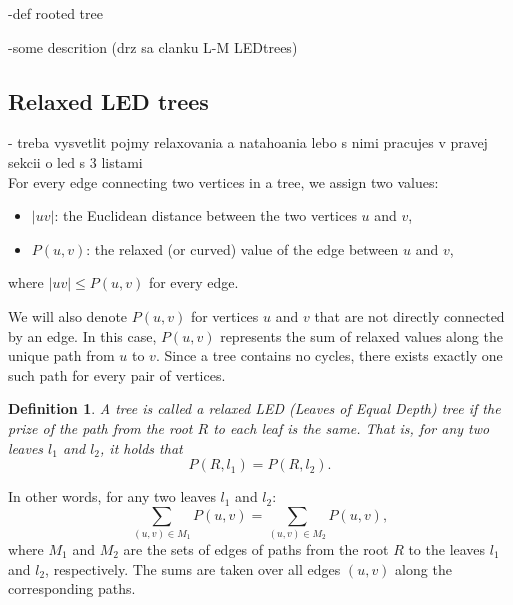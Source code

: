 \documentclass[12pt]{article}
\newcommand{\Prize}[2]{P(#1,#2)}
\newtheorem{definition}{Definition}
\begin{document}
		-def rooted tree
		
		-some descrition (drz sa clanku L-M LEDtrees)
		
	\subsection{Relaxed LED trees}	
	
		- treba vysvetlit pojmy relaxovania a natahoania lebo s nimi pracujes v pravej sekcii o led s 3 listami
			\\
		
				
		For every edge connecting two vertices in a tree, we assign two values:
		\begin{itemize}
			\item \( |uv| \): the Euclidean distance between the two vertices \( u \) and \( v \),
			\item \( \Prize{u}{v} \): the relaxed (or curved) value of the edge between \( u \) and \( v \),
		\end{itemize}
		where \( |uv| \leq \Prize{u}{v} \) for every edge.
		
		We will also denote \( \Prize{u}{v} \) for vertices \( u \) and \( v \) that are not directly connected by an edge. In this case, \( \Prize{u}{v} \) represents the sum of relaxed values along the unique path from \( u \) to \( v \). Since a tree contains no cycles, there exists exactly one such path for every pair of vertices.
		
		\begin{definition}\label{def:led}
			A tree is called a relaxed LED (Leaves of Equal Depth) tree if the prize of the path from the root \( R \) to each leaf is the same. That is, for any two leaves \( l_1 \) and \( l_2 \), it holds that
			\[
			\Prize{R}{l_1} = \Prize{R}{l_2}.
			\]
		\end{definition}
	
		In other words, for any two leaves \( l_1 \) and \( l_2 \):
		\[
		 \sum_{(u,v) \in M_1} \Prize{u}{v} = \sum_{(u,v) \in M_2} \Prize{u}{v},
		\]
		where \( M_1 \) and \( M_2 \) are the sets of edges of paths from the root \( R \) to the leaves \( l_1 \) and \( l_2 \), respectively. The sums are taken over all edges \( (u,v) \) along the corresponding paths.
		
\end{document}
